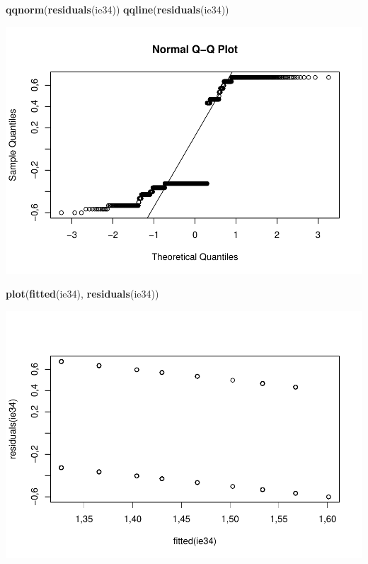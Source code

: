 \documentclass[]{article}
\newenvironment{Shaded}{\begin{snugshade}}{\end{snugshade}}
\newcommand{\KeywordTok}[1]{\textcolor[rgb]{0.13,0.29,0.53}{\textbf{#1}}}
\newcommand{\NormalTok}[1]{#1}
\begin{document}
\begin{Shaded}
\begin{Highlighting}[]
\KeywordTok{qqnorm}\NormalTok{(}\KeywordTok{residuals}\NormalTok{(ie34))}
\KeywordTok{qqline}\NormalTok{(}\KeywordTok{residuals}\NormalTok{(ie34))}
\end{Highlighting}
\end{Shaded}

\includegraphics{titanicDataClean_files/figure-latex/unnamed-chunk-25-19.pdf}

\begin{Shaded}
\begin{Highlighting}[]
\KeywordTok{plot}\NormalTok{(}\KeywordTok{fitted}\NormalTok{(ie34), }\KeywordTok{residuals}\NormalTok{(ie34))}
\end{Highlighting}
\end{Shaded}

\includegraphics{titanicDataClean_files/figure-latex/unnamed-chunk-25-20.pdf}
\end{document}
